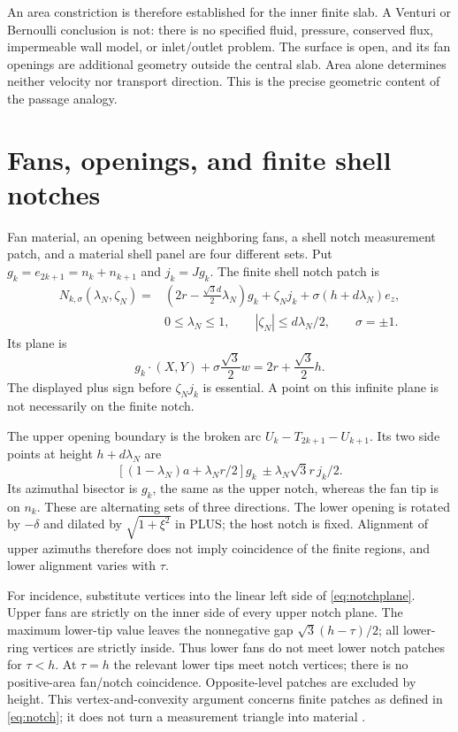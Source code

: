 \documentclass[11pt,a4paper]{article}
\numberwithin{equation}{section}
\begin{document}
An area constriction is therefore established for the inner finite slab.
A Venturi or Bernoulli conclusion is not: there is no specified fluid,
pressure, conserved flux, impermeable wall model, or inlet/outlet problem.
The surface is open, and its fan openings are additional geometry outside
the central slab. Area alone determines neither velocity nor transport
direction. This is the precise geometric content of the passage analogy.

\section{Fans, openings, and finite shell notches}\label{sec:openings}
Fan material, an opening between neighboring fans, a shell notch measurement
patch, and a material shell panel are four different sets. Put
$g_k=e_{2k+1}=n_k+n_{k+1}$ and $j_k=Jg_k$. The finite shell notch patch is
\begin{equation}\label{eq:notch}
\begin{aligned}
N_{k,\sigma}(\lambda_N,\zeta_N)
={}&\left(2r-\frac{\sqrt3d}{2}\lambda_N\right)g_k
+\zeta_Nj_k+\sigma(h+d\lambda_N)e_z,\\
&0\leq\lambda_N\leq1,\qquad
|\zeta_N|\leq d\lambda_N/2,\qquad \sigma=\pm1.
\end{aligned}
\end{equation}
Its plane is
\begin{equation}\label{eq:notchplane}
g_k\cdot(X,Y)+\sigma\frac{\sqrt3}{2}w
=2r+\frac{\sqrt3}{2}h.
\end{equation}
The displayed plus sign before $\zeta_Nj_k$ is essential. A point on this
infinite plane is not necessarily on the finite notch.

The upper opening boundary is the broken arc
$U_k-T_{2k+1}-U_{k+1}$. Its two side points at height $h+d\lambda_N$ are
\[
\left[(1-\lambda_N)a+\lambda_Nr/2\right]g_k
\ \pm\lambda_N\sqrt3r\,j_k/2.
\]
Its azimuthal bisector is $g_k$, the same as the upper notch, whereas the fan
tip is on $n_k$. These are alternating sets of three directions. The lower
opening is rotated by $-\delta$ and dilated by $\sqrt{1+\xi^2}$ in PLUS;
the host notch is fixed. Alignment of upper azimuths therefore does not imply
coincidence of the finite regions, and lower alignment varies with $\tau$.

For incidence, substitute vertices into the linear left side of
\eqref{eq:notchplane}. Upper fans are strictly on the inner side of every
upper notch plane. The maximum lower-tip value leaves the nonnegative
gap $\sqrt3(h-\tau)/2$; all lower-ring vertices are strictly inside.
Thus lower fans do not meet lower notch patches for $\tau<h$.
At $\tau=h$ the relevant lower tips meet notch vertices; there is no
positive-area fan/notch coincidence. Opposite-level patches are excluded by
height. This vertex-and-convexity argument concerns finite patches as defined
in \eqref{eq:notch}; it does not turn a measurement triangle into material
\cite[R2, Sections 3--4]{R2}.
\end{document}
